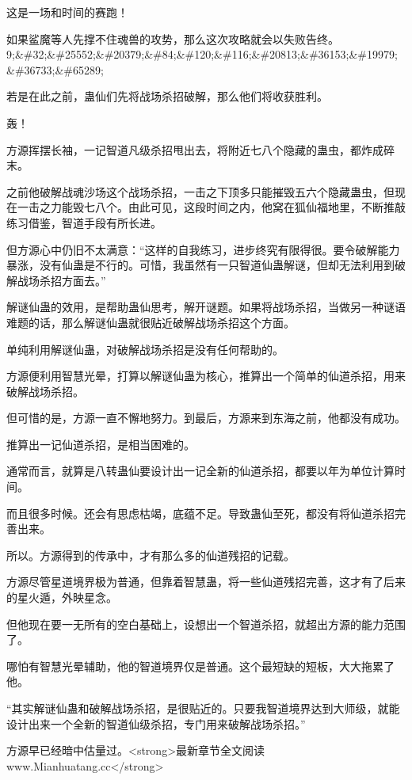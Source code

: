 
\begin{this_body}

这是一场和时间的赛跑！

如果鲨魔等人先撑不住魂兽的攻势，那么这次攻略就会以失败告终。9;\&\#32;\&\#25552;\&\#20379;\&\#84;\&\#120;\&\#116;\&\#20813;\&\#36153;\&\#19979;\&\#36733;\&\#65289;

若是在此之前，蛊仙们先将战场杀招破解，那么他们将收获胜利。

轰！

方源挥摆长袖，一记智道凡级杀招甩出去，将附近七八个隐藏的蛊虫，都炸成碎末。

之前他破解战魂沙场这个战场杀招，一击之下顶多只能摧毁五六个隐藏蛊虫，但现在一击之力能毁七八个。由此可见，这段时间之内，他窝在狐仙福地里，不断推敲练习借鉴，智道手段有所长进。

但方源心中仍旧不太满意：“这样的自我练习，进步终究有限得很。要令破解能力暴涨，没有仙蛊是不行的。可惜，我虽然有一只智道仙蛊解谜，但却无法利用到破解战场杀招方面去。”

解谜仙蛊的效用，是帮助蛊仙思考，解开谜题。如果将战场杀招，当做另一种谜语难题的话，那么解谜仙蛊就很贴近破解战场杀招这个方面。

单纯利用解谜仙蛊，对破解战场杀招是没有任何帮助的。

方源便利用智慧光晕，打算以解谜仙蛊为核心，推算出一个简单的仙道杀招，用来破解战场杀招。

但可惜的是，方源一直不懈地努力。到最后，方源来到东海之前，他都没有成功。

推算出一记仙道杀招，是相当困难的。

通常而言，就算是八转蛊仙要设计出一记全新的仙道杀招，都要以年为单位计算时间。

而且很多时候。还会有思虑枯竭，底蕴不足。导致蛊仙至死，都没有将仙道杀招完善出来。

所以。方源得到的传承中，才有那么多的仙道残招的记载。

方源尽管星道境界极为普通，但靠着智慧蛊，将一些仙道残招完善，这才有了后来的星火遁，外映星念。

但他现在要一无所有的空白基础上，设想出一个智道杀招，就超出方源的能力范围了。

哪怕有智慧光晕辅助，他的智道境界仅是普通。这个最短缺的短板，大大拖累了他。

“其实解谜仙蛊和破解战场杀招，是很贴近的。只要我智道境界达到大师级，就能设计出来一个全新的智道仙级杀招，专门用来破解战场杀招。”

方源早已经暗中估量过。<strong>最新章节全文阅读www.Mianhuatang.cc</strong>


\end{this_body}
